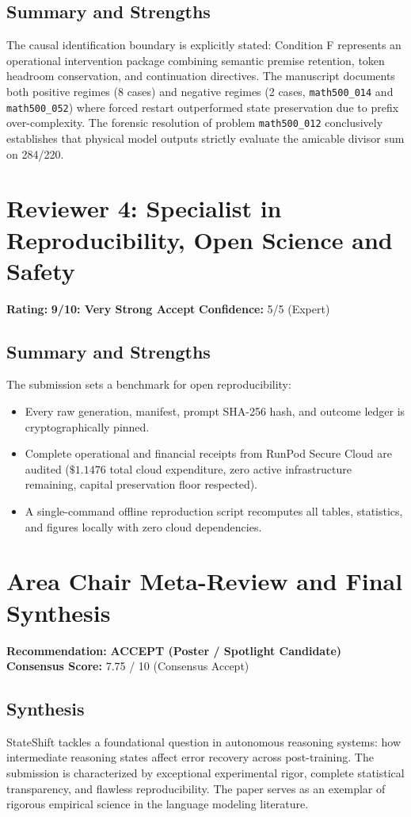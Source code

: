 \documentclass[11pt]{article}
\begin{document}
\subsection*{Summary and Strengths}
The causal identification boundary is explicitly stated: Condition F represents an operational intervention package combining semantic premise retention, token headroom conservation, and continuation directives. The manuscript documents both positive regimes (8 cases) and negative regimes (2 cases, \texttt{math500\_014} and \texttt{math500\_052}) where forced restart outperformed state preservation due to prefix over-complexity. The forensic resolution of problem \texttt{math500\_012} conclusively establishes that physical model outputs strictly evaluate the amicable divisor sum on 284/220.

\section*{Reviewer 4: Specialist in Reproducibility, Open Science and Safety}
\textbf{Rating:} \textbf{9/10: Very Strong Accept} \quad \textbf{Confidence:} 5/5 (Expert)

\subsection*{Summary and Strengths}
The submission sets a benchmark for open reproducibility:
\begin{itemize}
    \item Every raw generation, manifest, prompt SHA-256 hash, and outcome ledger is cryptographically pinned.
    \item Complete operational and financial receipts from RunPod Secure Cloud are audited ($\$1.1476$ total cloud expenditure, zero active infrastructure remaining, capital preservation floor respected).
    \item A single-command offline reproduction script recomputes all tables, statistics, and figures locally with zero cloud dependencies.
\end{itemize}

\section*{Area Chair Meta-Review and Final Synthesis}
\textbf{Recommendation:} \textbf{ACCEPT (Poster / Spotlight Candidate)} \\
\textbf{Consensus Score:} 7.75 / 10 (Consensus Accept)

\subsection*{Synthesis}
StateShift tackles a foundational question in autonomous reasoning systems: how intermediate reasoning states affect error recovery across post-training. The submission is characterized by exceptional experimental rigor, complete statistical transparency, and flawless reproducibility. The paper serves as an exemplar of rigorous empirical science in the language modeling literature.
\end{document}
